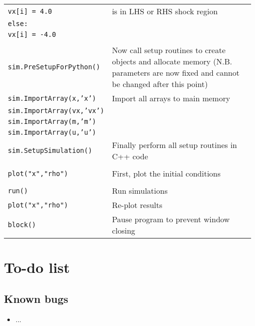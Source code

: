 \documentclass[a4paper]{article}
\newcommand{\var}[1]{\texttt{#1}}
\begin{document}
\begin{tabular}{p{9cm}p{6.0cm}}
\hspace{1cm}\var{vx[i] = 4.0}   & is in LHS or RHS shock region \\
\hspace{0.5cm}\var{else:} & \\
\hspace{1cm}\var{vx[i] = -4.0} & \\
& \\  
\var{sim.PreSetupForPython()}  & Now call setup routines to create objects and allocate memory 
(N.B. parameters are now fixed and cannot be changed after this point) \\
\var{sim.ImportArray(x,'x')}    & Import all arrays to main memory \\
\var{sim.ImportArray(vx,'vx')}  & \\
\var{sim.ImportArray(m,'m')}    & \\
\var{sim.ImportArray(u,'u')}    & \\
\var{sim.SetupSimulation()}     & Finally perform all setup routines in C++ code\\
& \\                                  
\var{plot("x","rho")}           & First, plot the initial conditions \\ 
& \\              
\var{run()}                     & Run simulations \\
\var{plot("x","rho")}           & Re-plot results \\
\var{block()}                   & Pause program to prevent window closing \\
\end{tabular}
\newline




\section{To-do list}

\subsection{Known bugs}
\begin{itemize}
\item ...
\end{itemize}
\end{document}
